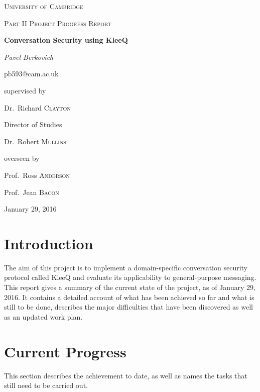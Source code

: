 \documentclass[12pt, a4paper]{article}
\begin{document}
\begin{titlepage}
	\centering
	{\scshape\LARGE University of Cambridge\par}
	\vspace{1cm}
	{\scshape\Large Part II Project Progress Report\par}
	\vspace{2cm}
	{\huge\bfseries Conversation Security using KleeQ \par}
	\vspace{2cm}
	{\Large\itshape Pavel Berkovich\par 
	\small pb593@cam.ac.uk}
	
	\vfill
	supervised by\par
	Dr.~Richard \textsc{Clayton}
	
	\vspace{1cm}
	Director of Studies\par
	Dr.~Robert \textsc{Mullins}
	
	\vspace{1cm}
	overseen by\par
	Prof.~Ross \textsc{Anderson}\par
	Prof.~Jean \textsc{Bacon}
	

	\vspace{1cm}

	{\large January 29, 2016 \par}
\end{titlepage}


\section{Introduction}
The aim of this project is to implement a domain-specific conversation security protocol called KleeQ \cite{kleeq} and evaluate its applicability to general-purpose messaging. This report gives a summary of the current state of the project, as of January 29, 2016. It contains a detailed account of what has been achieved so far and what is still to be done, describes the major difficulties that have been discovered as well as an updated work plan.

\section{Current Progress}
This section describes the achievement to date, as well as names the tasks that still need to be carried out.
\end{document}
